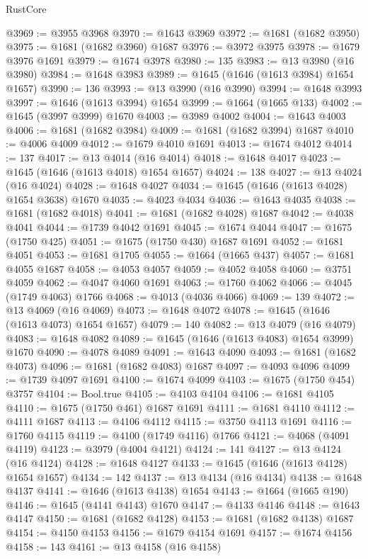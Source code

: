 \begin{lexlean}{RustCore}
\begin{coremodule}
@3969 := @3955 @3968
@3970 := @1643 @3969
@3972 := @1681 (@1682 @3950)
@3975 := @1681 (@1682 @3960) @1687
@3976 := @3972 @3975
@3978 := @1679 @3976 @1691
@3979 := @1674 @3978
@3980 := 135
@3983 := @13 @3980 (@16 @3980)
@3984 := @1648 @3983
@3989 := @1645 (@1646 (@1613 @3984) @1654 @1657)
@3990 := 136
@3993 := @13 @3990 (@16 @3990)
@3994 := @1648 @3993
@3997 := @1646 (@1613 @3994) @1654
@3999 := @1664 (@1665 @133)
@4002 := @1645 (@3997 @3999) @1670
@4003 := @3989 @4002
@4004 := @1643 @4003
@4006 := @1681 (@1682 @3984)
@4009 := @1681 (@1682 @3994) @1687
@4010 := @4006 @4009
@4012 := @1679 @4010 @1691
@4013 := @1674 @4012
@4014 := 137
@4017 := @13 @4014 (@16 @4014)
@4018 := @1648 @4017
@4023 := @1645 (@1646 (@1613 @4018) @1654 @1657)
@4024 := 138
@4027 := @13 @4024 (@16 @4024)
@4028 := @1648 @4027
@4034 := @1645 (@1646 (@1613 @4028) @1654 @3638) @1670
@4035 := @4023 @4034
@4036 := @1643 @4035
@4038 := @1681 (@1682 @4018)
@4041 := @1681 (@1682 @4028) @1687
@4042 := @4038 @4041
@4044 := @1739 @4042 @1691
@4045 := @1674 @4044
@4047 := @1675 (@1750 @425)
@4051 := @1675 (@1750 @430) @1687 @1691
@4052 := @1681 @4051
@4053 := @1681 @1705
@4055 := @1664 (@1665 @437)
@4057 := @1681 @4055 @1687
@4058 := @4053 @4057
@4059 := @4052 @4058
@4060 := @3751 @4059
@4062 := @4047 @4060 @1691
@4063 := @1760 @4062
@4066 := @4045 (@1749 @4063) @1766
@4068 := @4013 (@4036 @4066)
@4069 := 139
@4072 := @13 @4069 (@16 @4069)
@4073 := @1648 @4072
@4078 := @1645 (@1646 (@1613 @4073) @1654 @1657)
@4079 := 140
@4082 := @13 @4079 (@16 @4079)
@4083 := @1648 @4082
@4089 := @1645 (@1646 (@1613 @4083) @1654 @3999) @1670
@4090 := @4078 @4089
@4091 := @1643 @4090
@4093 := @1681 (@1682 @4073)
@4096 := @1681 (@1682 @4083) @1687
@4097 := @4093 @4096
@4099 := @1739 @4097 @1691
@4100 := @1674 @4099
@4103 := @1675 (@1750 @454) @3757
@4104 := Bool.true
@4105 := @4103 @4104
@4106 := @1681 @4105
@4110 := @1675 (@1750 @461) @1687 @1691
@4111 := @1681 @4110
@4112 := @4111 @1687
@4113 := @4106 @4112
@4115 := @3750 @4113 @1691
@4116 := @1760 @4115
@4119 := @4100 (@1749 @4116) @1766
@4121 := @4068 (@4091 @4119)
@4123 := @3979 (@4004 @4121)
@4124 := 141
@4127 := @13 @4124 (@16 @4124)
@4128 := @1648 @4127
@4133 := @1645 (@1646 (@1613 @4128) @1654 @1657)
@4134 := 142
@4137 := @13 @4134 (@16 @4134)
@4138 := @1648 @4137
@4141 := @1646 (@1613 @4138) @1654
@4143 := @1664 (@1665 @190)
@4146 := @1645 (@4141 @4143) @1670
@4147 := @4133 @4146
@4148 := @1643 @4147
@4150 := @1681 (@1682 @4128)
@4153 := @1681 (@1682 @4138) @1687
@4154 := @4150 @4153
@4156 := @1679 @4154 @1691
@4157 := @1674 @4156
@4158 := 143
@4161 := @13 @4158 (@16 @4158)

\end{coremodule}
\end{lexlean}
